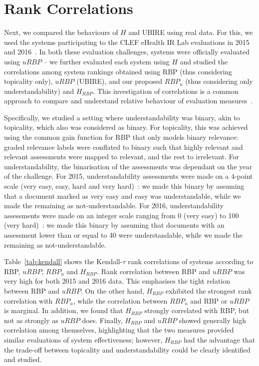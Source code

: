 



\section{Rank Correlations} %
\label{sec:clef}
Next, we compared the behaviours of $H$ and UBIRE using real data. For this, we used the systems participating to the CLEF eHealth IR Lab evaluations in 2015 and 2016~\cite{clefIR15,clefIR16}. In both these evaluation challenges, systems were officially evaluated using $uRBP$ -- we further evaluated each system using $H$ and studied the correlations among system rankings obtained using RBP (thus considering topicality only), $uRBP$ (UBIRE), and our proposed $RBP_u$ (thus considering only understandability) and $H_{RBP}$. This investigation of correlations is a common approach to compare and understand relative behaviour of evaluation measures~\cite{zuccon16}. 

Specifically, we studied a setting where understandability was binary, akin to topicality, which also was considered as binary. For topicality, this was achieved using the common gain function for RBP that only models binary relevance: graded relevance labels were conflated to binary such that highly relevant and relevant assessments were mapped to relevant, and the rest to irrelevant. For understandability, the binarisation of the assessments was dependant on the year of the challenge. For 2015, understandability assessments were made on a 4-point scale (very easy, easy, hard and very hard)~\cite{clefIR15}: we made this binary by assuming that a document marked as very easy and easy was understandable, while we made the remaining as not-understandable. For 2016, understandability assessments were made on an integer scale ranging from 0 (very easy) to 100 (very hard)~\cite{clefIR16}: we made this binary by assuming that documents with an assessment lower than or equal to 40 were understandable, while we made the remaining as not-understandable. 

Table~\ref{tab:kendall} shows the Kendall-$\tau$ rank correlations of systems according to RBP, $uRBP$, $RBP_u$ and $H_{RBP}$. Rank correlation between RBP and $uRBP$ was very high for both 2015 and 2016 data. This emphasises the tight relation between RBP and $uRBP$. On the other hand, $H_{RBP}$ exhibited the strongest rank correlation with $RBP_u$, while the correlation between $RBP_u$ and RBP or $uRBP$ is marginal. In addition, we found that $H_{RBP}$ strongly correlated with RBP, but not as strongly as  $uRBP$ does. Finally, $H_{RBP}$ and $uRBP$ showed generally high correlation among themselves, highlighting that the two measures provided similar evaluations of system effectiveness; however, $H_{RBP}$ had the advantage that the trade-off between topicality and understandability could be clearly identified and studied. 

